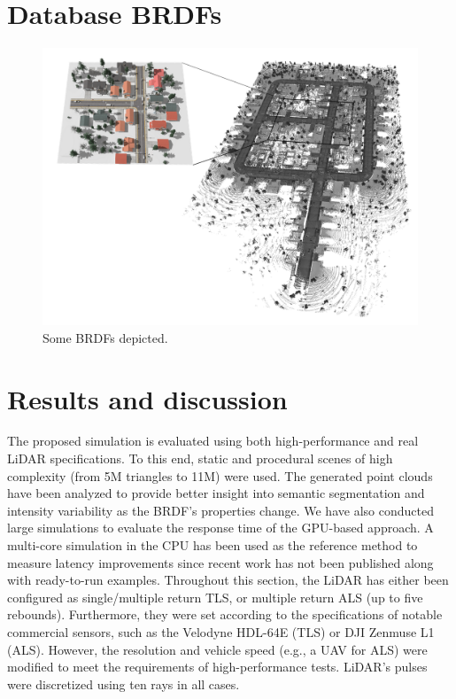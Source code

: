 \section{Database BRDFs}

\begin{figure}
    \centering
    \includegraphics[width=\linewidth]{figs/lidar_intensity/material_database_intensity_results.png}
    \caption{Some BRDFs depicted.  }
	\label{fig:lidar_material_database_intensity_result}
\end{figure}

\section{Results and discussion}

The proposed simulation is evaluated using both high-performance and real LiDAR specifications. To this end, static and procedural scenes of high complexity (from 5M triangles to 11M) were used. The generated point clouds have been analyzed to provide better insight into semantic segmentation and intensity variability as the BRDF's properties change. We have also conducted large simulations to evaluate the response time of the GPU-based approach. A multi-core simulation in the CPU has been used as the reference method to measure latency improvements since recent work has not been published along with ready-to-run examples. Throughout this section, the LiDAR has either been configured as single/multiple return TLS, or multiple return ALS (up to five rebounds). Furthermore, they were set according to the specifications of notable commercial sensors, such as the Velodyne HDL-64E (TLS) or DJI Zenmuse L1 (ALS). However, the resolution and vehicle speed (e.g., a UAV for ALS) were modified to meet the requirements of high-performance tests. LiDAR's pulses were discretized using ten rays in all cases.

